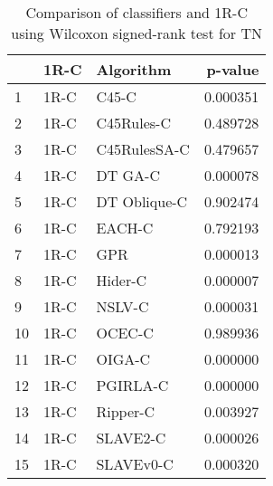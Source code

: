 \begin{table}
\footnotesize
\caption{Comparison of classifiers and 1R-C using Wilcoxon signed-rank test for TN}
\label{tab:1R-C wilcoxon TN comparison}
\begin{tabular}{lllr}
\hline
 & 1R-C & Algorithm & p-value \\
\hline
1 & 1R-C & C45-C & 0.000351 \\
2 & 1R-C & C45Rules-C & 0.489728 \\
3 & 1R-C & C45RulesSA-C & 0.479657 \\
4 & 1R-C & DT GA-C & 0.000078 \\
5 & 1R-C & DT Oblique-C & 0.902474 \\
6 & 1R-C & EACH-C & 0.792193 \\
7 & 1R-C & GPR & 0.000013 \\
8 & 1R-C & Hider-C & 0.000007 \\
9 & 1R-C & NSLV-C & 0.000031 \\
10 & 1R-C & OCEC-C & 0.989936 \\
11 & 1R-C & OIGA-C & 0.000000 \\
12 & 1R-C & PGIRLA-C & 0.000000 \\
13 & 1R-C & Ripper-C & 0.003927 \\
14 & 1R-C & SLAVE2-C & 0.000026 \\
15 & 1R-C & SLAVEv0-C & 0.000320 \\
\hline
\end{tabular}
\end{table}
